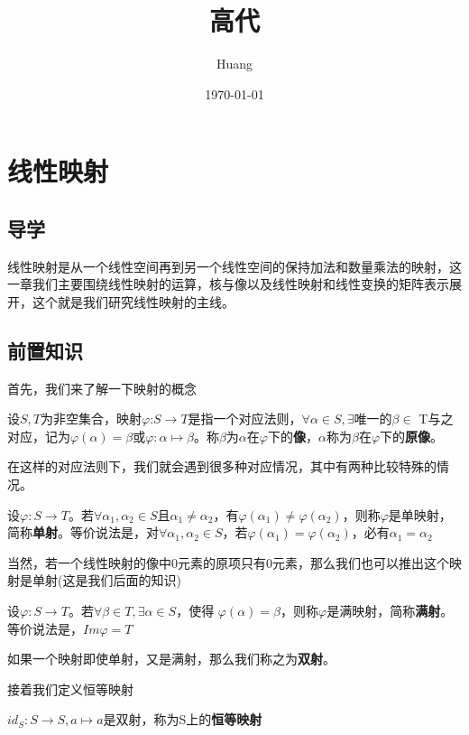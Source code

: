 \documentclass[lang=cn,10pt]{elegantbook}
\title{高代}
\author{ Huang}
\date{\today}
\begin{document}
\maketitle
\frontmatter

\tableofcontents

\mainmatter


\chapter{线性映射}
\section{导学}
线性映射是从一个线性空间再到另一个线性空间的保持加法和数量乘法的映射，这一章我们主要围绕线性映射的运算，核与像以及线性映射和线性变换的矩阵表示展开，这个就是我们研究线性映射的主线。
\section{前置知识}
首先，我们来了解一下映射的概念
\begin{definition}
	设$S,T$为非空集合，映射$\varphi$:$S\rightarrow T$是指一个对应法则，$\forall\alpha\in S,\exists$唯一的$\beta\in$ T与之对应，记为$\varphi(\alpha)=\beta\text{或}\varphi:\alpha\mapsto\beta$。称$\beta$为$\alpha$在$\varphi$下的\textbf{像}，$\alpha$称为$\beta$在$\varphi$下的\textbf{原像}。
\end{definition}
	在这样的对应法则下，我们就会遇到很多种对应情况，其中有两种比较特殊的情况。
	\begin{definition}[单射]
		设$\varphi:S\rightarrow T$。若$\forall\alpha_1,\alpha_2\in S$且$\alpha_1\neq\alpha_2$，有$\varphi(\alpha_1)\neq\varphi(\alpha_2)$，则称$\varphi$是单映射，简称\textbf{单射}。等价说法是，对$\forall\alpha_1,\alpha_2\in S$，若$\varphi(\alpha_1)=\varphi(\alpha_2)$，必有$\alpha_1=\alpha_2$
	\end{definition}

	当然，若一个线性映射的像中0元素的原项只有0元素，那么我们也可以推出这个映射是单射(这是我们后面的知识)
	\begin{definition}[满射]
		设$\varphi:S\rightarrow T$。若$\forall\beta\in T,\exists\alpha\in S$，使得 $\varphi(\alpha)=\beta$，则称$\varphi$是满映射，简称\textbf{满射}。等价说法是，$Im{\varphi}=T$
	\end{definition}
	 如果一个映射即使单射，又是满射，那么我们称之为\textbf{双射}。
	 
	接着我们定义恒等映射
	\begin{definition}[恒等映射]
			$id_S:S\rightarrow S,a\mapsto a$是双射，称为S上的\textbf{恒等映射}
	\end{definition}
\end{document}
